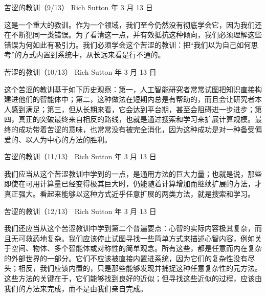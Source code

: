 \documentclass[UTF8,aspectratio=169,11pt,fontset=none]{ctexbeamer}
\begin{document}
\begin{frame}[t]{苦涩的教训（9/13）}
\relax
{\small\color{accent}Rich Sutton 年 3 月 13 日}\par
\vspace{0.22cm}
\begingroup
\fontsize{12}{20}\selectfont
这是一个重大的教训。作为一个领域，我们至今仍然没有彻底学会它，因为我们还在不断犯同一类错误。为了看清这一点，并有效抵抗这种倾向，我们必须理解这些错误为何如此有吸引力。我们必须学会这个苦涩的教训：把“我们以为自己如何思考”的方式内置到系统中，从长远来看是行不通的。
\par\endgroup
\end{frame}

\begin{frame}[t]{苦涩的教训（10/13）}
\relax
{\small\color{accent}Rich Sutton 年 3 月 13 日}\par
\vspace{0.22cm}
\begingroup
\fontsize{12}{20}\selectfont
这个苦涩的教训基于如下历史观察：第一，人工智能研究者常常试图把知识直接构建进他们的智能体中；第二，这种做法在短期内总是有帮助的，而且会让研究者本人感到满足；第三，但从长期来看，它会达到平台期，甚至会阻碍进一步进步；第四，真正的突破最终来自相反的路线，也就是通过搜索和学习来扩展计算规模。最终的成功带着苦涩的意味，也常常没有被完全消化，因为这种成功是对一种备受偏爱的、以人为中心的方法的胜利。
\par\endgroup
\end{frame}

\begin{frame}[t]{苦涩的教训（11/13）}
\relax
{\small\color{accent}Rich Sutton 年 3 月 13 日}\par
\vspace{0.22cm}
\begingroup
\fontsize{12}{20}\selectfont
我们应当从这个苦涩教训中学到的一点，是通用方法的巨大力量；也就是说，那些即使在可用计算量已经变得极其巨大时，仍能随着计算增加而继续扩展的方法，才真正强大。看起来能够以这种方式近乎任意扩展的两类方法，就是搜索和学习。
\par\endgroup
\end{frame}

\begin{frame}[t]{苦涩的教训（12/13）}
\relax
{\small\color{accent}Rich Sutton 年 3 月 13 日}\par
\vspace{0.22cm}
\begingroup
\fontsize{12}{20}\selectfont
我们还应当从这个苦涩教训中学到第二个普遍要点：心智的实际内容极其复杂，而且无可救药地复杂。我们应该停止试图寻找一些简单方式来描述心智内容，例如关于空间、物体、多个智能体或对称性的简单观念。所有这些，都是任意而内在复杂的外部世界的一部分。它们不应该被直接内置进系统，因为它们的复杂性没有尽头；相反，我们应该内置的，只是那些能够发现并捕捉这种任意复杂性的元方法。这些方法的关键在于，它们能够找到良好的近似；但寻找这些近似的过程，应该由我们的方法来完成，而不是由我们亲自完成。
\par\endgroup
\end{frame}
\end{document}
